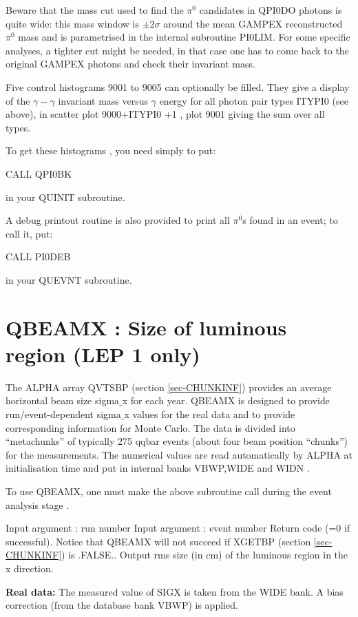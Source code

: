 \par
  Beware that the mass cut used to find the $\pi^0$ candidates in QPI0DO
  photons is quite wide: this mass window is $\pm 2\sigma$  around the
  mean GAMPEX reconstructed $\pi^0$ mass and is parametrised in the internal subroutine
  PI0LIM.  For some specific analyses, a tighter cut
  might be needed, in that case one has to come back to the original
  GAMPEX photons and check their invariant mass.
\par
  Five control histograms 9001 to 9005  can optionally be filled.
  They give a display of the $\gamma-\gamma$ invariant mass versus $\gamma$ energy
   for all photon pair  types ITYPI0 (see above), in scatter plot 9000+ITYPI0 +1 ,
   plot 9001 giving the sum over all types.
\par
  To get these histograms , you need simply to put:
\par
CALL QPI0BK
\par
in your QUINIT subroutine.
 
\par
  A debug printout routine is also provided to print all $\pi^0$s found in an event;
  to call it, put:
\par
CALL PI0DEB
\par
in your QUEVNT subroutine.
 
 
\par
\section{\label{sec-OAQBEAM}QBEAMX : Size of luminous region (LEP 1 only)}
\par
{}
\par
The ALPHA array QVTSBP (section \ref{sec-CHUNKINF}) provides an average
horizontal beam size sigma$\_$x for each year.  QBEAMX is designed
to provide run/event-dependent sigma$\_$x values for the real data
and to provide corresponding information for Monte Carlo.  The
data is divided into ``metachunks'' of typically 275 qqbar events
(about four beam position ``chunks'') for the measurements. The numerical values are
read automatically by ALPHA at initialisation time and put in internal banks VBWP,WIDE and WIDN .
 
To use QBEAMX, one must make the above subroutine call during the event analysis stage .
 
\begin{indentlist}{ 3.50cm}{ 3.75cm}
 
   Input argument : run number
   Input argument : event number
   Return code
                               (=0 if successful).  Notice that QBEAMX will
  not succeed if XGETBP (section \ref{sec-CHUNKINF}) is .FALSE..
            Output rms size (in cm) of the luminous region in the x direction.
\end{indentlist}
\par
{\bf Real data:}
The measured value of SIGX is taken from the WIDE bank.  A bias
correction (from the database bank VBWP) is applied.
\par
 
